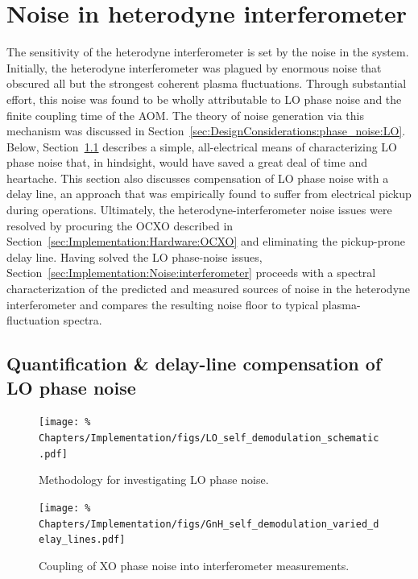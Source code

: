 \section{Noise in heterodyne interferometer}
\label{sec:Implementation:Noise}
The sensitivity of the heterodyne interferometer
is set by the noise in the system.
Initially, the heterodyne interferometer
was plagued by enormous noise that obscured
all but the strongest coherent plasma fluctuations.
Through substantial effort,
this noise was found to be wholly attributable to
LO phase noise and the finite coupling time of the AOM.
The theory of noise generation via this mechanism was discussed in
Section~\ref{sec:DesignConsiderations:phase_noise:LO}.
Below, Section~\ref{sec:Implementation:Noise:LO}
describes a simple, all-electrical means
of characterizing LO phase noise that, in hindsight,
would have saved a great deal of time and heartache.
This section also discusses compensation
of LO phase noise with a delay line,
an approach that was empirically found to suffer from electrical pickup
during \diiid\space operations.
Ultimately, the heterodyne-interferometer noise issues
were resolved by procuring the OCXO described in
Section~\ref{sec:Implementation:Hardware:OCXO} and
eliminating the pickup-prone delay line.
Having solved the LO phase-noise issues,
Section~\ref{sec:Implementation:Noise:interferometer}
proceeds with a spectral characterization
of the predicted and measured sources of noise
in the heterodyne interferometer and
compares the resulting noise floor
to typical plasma-fluctuation spectra.


\subsection{Quantification \& delay-line compensation of LO phase noise}
\label{sec:Implementation:Noise:LO}
\begin{figure}
  \centering
  \texttt{[image: \%
    Chapters/Implementation/figs/LO\_self\_demodulation\_schematic.pdf]}
  \caption[Methodology for investigating LO phase noise]{%
    Methodology for investigating LO phase noise.
  }
  \label{fig:Implementation:LO_self_demodulation_schematic}
\end{figure}

\begin{figure}
  \centering
  \texttt{[image: \%
    Chapters/Implementation/figs/GnH\_self\_demodulation\_varied\_delay\_lines.pdf]}
  \caption[Coupling of XO phase noise into interferometer measurements]{%
    Coupling of XO phase noise into interferometer measurements.
  }
  \label{fig:Implementation:GnH_self_demodulation}
\end{figure}

